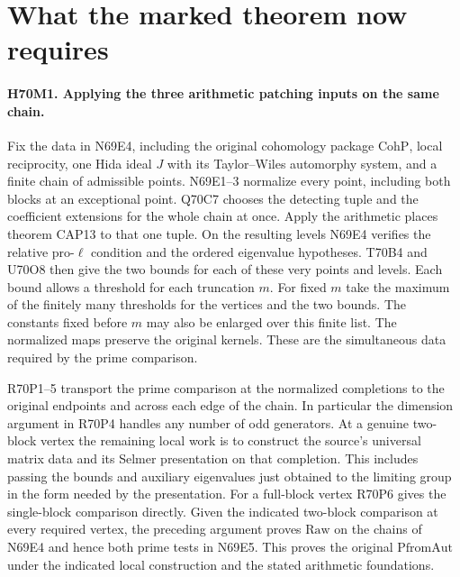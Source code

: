 \section{What the marked theorem now requires}

\paragraph{H70M1. Applying the three arithmetic patching inputs on the same chain.}
Fix the data in N69E4, including the original cohomology package
$\mathrm{CohP}$, local reciprocity, one Hida ideal $J$ with its
Taylor--Wiles automorphy system, and a finite chain of admissible
points. N69E1--3 normalize every point, including both blocks at an
exceptional point. Q70C7 chooses the detecting tuple and the
coefficient extensions for the whole chain at once. Apply the
arithmetic places theorem CAP13 to that one tuple. On the resulting
levels N69E4 verifies the relative pro-$\ell$ condition and the
ordered eigenvalue hypotheses. T70B4 and U70O8 then give the two
bounds for each of these very points and levels. Each bound allows
a threshold for each truncation $m$. For fixed $m$ take the maximum
of the finitely many thresholds for the vertices and the two
bounds. The constants fixed before $m$ may also be enlarged over
this finite list. The normalized maps preserve the original kernels.
These are the simultaneous data required by the prime comparison.

R70P1--5 transport the prime comparison at the normalized completions
to the original endpoints and across each edge of the chain. In
particular the dimension argument in R70P4 handles any number of
odd generators. At a genuine two-block vertex the remaining local
work is to construct the source's universal matrix data and its
Selmer presentation on that completion. This includes passing the
bounds and auxiliary eigenvalues just obtained to the limiting
group in the form needed by the presentation. For a full-block
vertex R70P6 gives the single-block comparison directly. Given
the indicated two-block comparison at every required vertex, the
preceding argument proves $\mathrm{Raw}$ on the chains of N69E4
and hence both prime tests in N69E5. This proves the original
$\mathrm{PfromAut}$ under the indicated local construction and
the stated arithmetic foundations.

